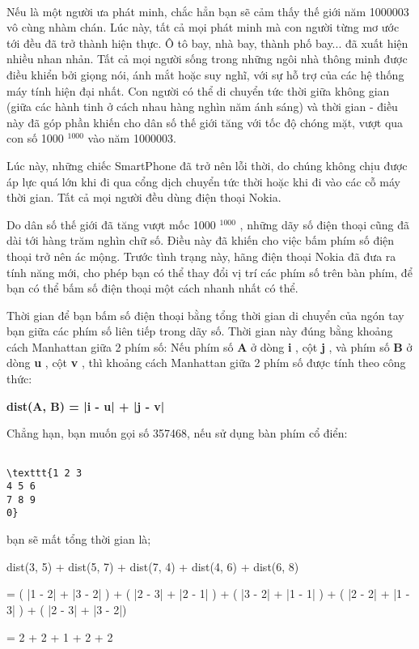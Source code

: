

 

Nếu là một người ưa phát minh, chắc hẳn bạn sẽ cảm thấy thế giới năm 1000003 vô cùng nhàm chán. Lúc này, tất cả mọi phát minh mà con người từng mơ ước tới đều đã trở thành hiện thực. Ô tô bay, nhà bay, thành phố bay... đã xuất hiện nhiều nhan nhản. Tất cả mọi người sống trong những ngôi nhà thông minh được điều khiển bởi giọng nói, ánh mắt hoặc suy nghĩ, với sự hỗ trợ của các hệ thống máy tính hiện đại nhất. Con người có thể di chuyển tức thời giữa không gian (giữa các hành tinh ở cách nhau hàng nghìn năm ánh sáng) và thời gian - điều này đã góp phần khiến cho dân số thế giới tăng với tốc độ chóng mặt, vượt qua con số 1000 $^ 1000 $ vào năm 1000003.

Lúc này, những chiếc SmartPhone đã trở nên lỗi thời, do chúng không chịu được áp lực quá lớn khi đi qua cổng dịch chuyển tức thời hoặc khi đi vào các cỗ máy thời gian. Tất cả mọi người đều dùng điện thoại Nokia.

Do dân số thế giới đã tăng vượt mốc 1000 $^ 1000 $ , những dãy số điện thoại cũng đã dài tới hàng trăm nghìn chữ số. Điều này đã khiến cho việc bấm phím số điện thoại trở nên ác mộng. Trước tình trạng này, hãng điện thoại Nokia đã đưa ra tính năng mới, cho phép bạn có thể thay đổi vị trí các phím số trên bàn phím, để bạn có thể bấm số điện thoại một cách nhanh nhất có thể.

Thời gian để bạn bấm số điện thoại bằng tổng thời gian di chuyển của ngón tay bạn giữa các phím số liên tiếp trong dãy số. Thời gian này đúng bằng khoảng cách Manhattan giữa 2 phím số: Nếu phím số \textbf{ A } ở dòng \textbf{ i } , cột \textbf{ j } , và phím số \textbf{ B } ở dòng \textbf{ u } , cột \textbf{ v } , thì khoảng cách Manhattan giữa 2 phím số được tính theo công thức:

\textbf{dist(A, B) = |i - u| + |j - v| }

Chẳng hạn, bạn muốn gọi số 357468, nếu sử dụng bàn phím cổ điển:
\begin{verbatim}

\texttt{1 2 3
4 5 6
7 8 9
0}\end{verbatim}

bạn sẽ mất tổng thời gian là;

dist(3, 5) + dist(5, 7) + dist(7, 4) + dist(4, 6) + dist(6, 8)

= ( |1 - 2| + |3 - 2| ) + ( |2 - 3| + |2 - 1| ) + ( |3 - 2| + |1 - 1| ) + ( |2 - 2| + |1 - 3| ) + ( |2 - 3| + |3 - 2|)

= 2 + 2 + 1 + 2 + 2

